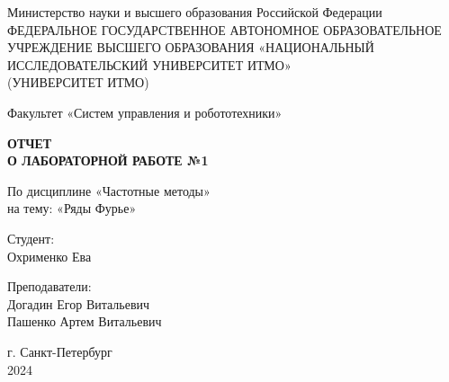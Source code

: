 \documentclass[a4paper,12pt]{article}
\begin{document}
\begin{titlepage}
    \centering
    \vspace*{1cm}

    {\large Министерство науки и высшего образования Российской Федерации}\\
    {\large ФЕДЕРАЛЬНОЕ ГОСУДАРСТВЕННОЕ АВТОНОМНОЕ ОБРАЗОВАТЕЛЬНОЕ УЧРЕЖДЕНИЕ ВЫСШЕГО ОБРАЗОВАНИЯ «НАЦИОНАЛЬНЫЙ ИССЛЕДОВАТЕЛЬСКИЙ УНИВЕРСИТЕТ ИТМО»}\\
    {\large (УНИВЕРСИТЕТ ИТМО)}\\

    \vspace{2cm}

    {\large Факультет «Систем управления и робототехники»}\\

    \vspace{3cm}

    \textbf{{\Huge ОТЧЕТ}\\
    {\Huge О ЛАБОРАТОРНОЙ РАБОТЕ №1}}\\

    \vspace{1cm}

    {\LARGE По дисциплине «Частотные методы»}\\
    {\LARGE на тему: «Ряды Фурье»}\\

    \vspace{3cm}

    {\Large Студент:}\\
    Охрименко Ева

    \vspace{2cm}

    {\Large Преподаватели:}\\
    Догадин Егор Витальевич\\
    Пашенко Артем Витальевич\\

    \vspace{2cm}

    {\large г. Санкт-Петербург}\\
    {\large 2024}

\end{titlepage}
\newpage
\tableofcontents
\newpage


\end{document}
